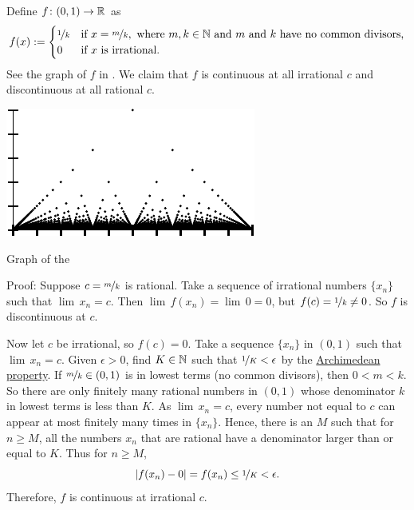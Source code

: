 \begin{example} \label{popcornfunction:example}
Define $f \colon (0,1) \to {\mathbb{R}}$ as
\begin{equation*}
f(x) := 
\begin{cases}
\nicefrac{1}{k} & \text{if } x=\nicefrac{m}{k}, \text{ where } m,k \in {\mathbb{N}}
\text{ and } m \text{ and } k \text{ have no common divisors,} \\
0 & \text{if } x \text{ is irrational.}
\end{cases}
\end{equation*}
See the graph of $f$
in .
We claim that
$f$ is continuous at all irrational $c$ and 
discontinuous at all rational $c$.
\begin{myfigureht}
\includegraphics{figures/popcornfig}
\caption{Graph of the \label{popcornfig}}
\end{myfigureht}

Proof:
Suppose $c = \nicefrac{m}{k}$ is rational.  Take a sequence of
irrational numbers $\{ x_n \}$ such that $\lim\, x_n = c$.  Then
$\lim\, f(x_n) = \lim \, 0 = 0$, but $f(c) = \nicefrac{1}{k} \not= 0$.  So $f$
is discontinuous at $c$.

Now let $c$ be irrational, so $f(c) = 0$.  Take a sequence 
$\{ x_n \}$ in $(0,1)$ such that $\lim\, x_n = c$.
Given $\epsilon > 0$, find $K \in {\mathbb{N}}$ such
that $\nicefrac{1}{K} < \epsilon$
by the \hyperref[thm:arch:i]{Archimedean property}.
If $\nicefrac{m}{k} \in (0,1)$ is in lowest terms
(no common divisors), then $0 < m < k$.
So there are only finitely many rational numbers in $(0,1)$
whose denominator $k$ in lowest terms is less than $K$.
As $\lim\, x_n = c$, every number not equal to $c$ can appear at most
finitely many times in $\{ x_n \}$.
Hence,
there is an $M$ such that for $n \geq M$, all the numbers $x_n$
that are rational
have a denominator larger than or equal to $K$.  Thus for $n \geq M$,
\begin{equation*}
\left\lvert {f(x_n) - 0} \right\rvert = f(x_n) \leq \nicefrac{1}{K} < \epsilon .
\end{equation*}
Therefore, $f$ is continuous at irrational $c$.
\end{example}

